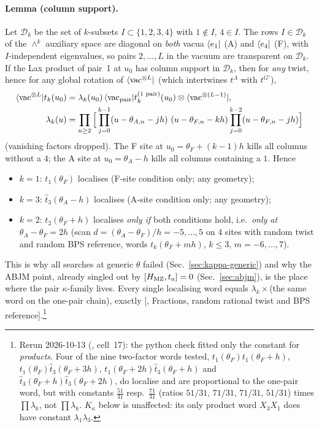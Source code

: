 \paragraph{Lemma (column support).} Let $\mathcal D_k$ be the set of $k$-subsets $I\subset\{1,2,3,4\}$ with $1\notin I$, $4\in I$. The rows $I\in\mathcal D_k$ of the $\wedge^k$ auxiliary space
are diagonal on \emph{both} vacua $\langle e_1|$ (A) and $\langle e_4|$ (F), with $I$-independent eigenvalues, so pairs $2,\dots,L$ in the vacuum are transparent on $\mathcal D_k$. If the Lax product of
pair~1 at $u_0$ has column support in $\mathcal D_k$, then for \emph{any} twist, hence for any global rotation of $\langle\mathrm{vac}^{\otimes L}|$ (which intertwines $t^\Lambda$ with $t^{G'}$),
\begin{align}
 \bra{\vac^{\otimes L}}t_k(u_0)&=\lambda_k(u_0)\,\bra{\vac_{\rm pair}}t_k^{(1\text{ pair})}(u_0)\otimes\bra{\vac^{\otimes(L-1)}},\\
 \lambda_k(u)&=\prod_{n\ge2}\Big[\prod_{j=0}^{k-1}(u-\theta_{A,n}-jh)\ (u-\theta_{F,n}-kh)\prod_{j=0}^{k-2}(u-\theta_{F,n}-jh)\Big]
\end{align}
(vanishing factors dropped). The F site at $u_0=\theta_F+(k-1)h$ kills all columns without a $4$; the A site at $u_0=\theta_A-h$ kills all columns containing a $1$. Hence
\begin{itemize}
\item $k=1$: $t_1(\theta_F)$ localises (F-site condition only; any geometry);
\item $k=3$: $\hat t_3(\theta_A-h)$ localises (A-site condition only; any geometry);
\item $k=2$: $t_2(\theta_F+h)$ localises \emph{only if} both conditions hold, i.e.\ \emph{only at $\theta_A-\theta_F=2h$} (scan $d=(\theta_A-\theta_F)/h=-5,\dots,5$ on 4 sites with random twist and random BPS reference, words $t_k(\theta_F+mh)$, $k\le3$, $m=-6,\dots,7$).
\end{itemize}
This is why all searches at generic $\theta$ failed (Sec.~\ref{sec:kappa-generic}) and why the ABJM point, already singled out by $[H_{\rm MZ},t_a]=0$ (Sec.~\ref{sec:abjm}), is the place where the pair $\kappa$-family lives.
Every single localising word equals $\lambda_k\times$(the same word on the one-pair chain), exactly [, Fractions, random rational twist and BPS reference].\footnote{Rerun 2026-10-13 (, cell~17):
the python check fitted only the constant for \emph{products}. Four of the nine two-factor words tested, $t_1(\theta_F)t_1(\theta_F+h)$, $t_1(\theta_F)\hat t_3(\theta_F+3h)$, $t_1(\theta_F+2h)\hat t_3(\theta_F+h)$ and $\hat t_3(\theta_F+h)\hat t_3(\theta_F+2h)$, do localise and are
proportional to the one-pair word, but with constants $\tfrac{51}{31}$ resp.\ $\tfrac{71}{31}$ (ratios $51/31,\,71/31,\,71/31,\,51/31$) times $\prod\lambda_k$, not $\prod\lambda_k$. $K_\kappa$ below is unaffected: its only product word $X_3X_1$ does have constant $\lambda_1\lambda_3$.}

